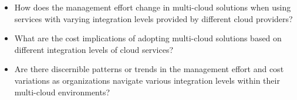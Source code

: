 \begin{itemize}
    \item How does the management effort change in multi-cloud solutions when using services with varying integration levels provided by different cloud providers?
    \item What are the cost implications of adopting multi-cloud solutions based on different integration levels of cloud services?
    \item Are there discernible patterns or trends in the management effort 
    and cost variations as organizations navigate various integration levels within their multi-cloud environments?
\end{itemize}


